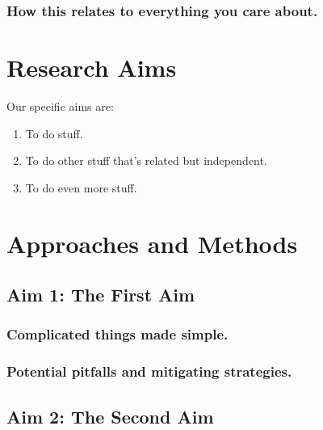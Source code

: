 \documentclass[12pt]{article}
\begin{document}
\subsubsection * {How this relates to everything you care about.}

\lipsum[8-11]


\section {Research Aims}

\lipsum[5]
Our specific aims are:
\vspace{-6pt}
\begin{enumerate}
\itemsep 0pt
\parskip 2pt
\item  To do stuff.
\item  To do other stuff that's related but independent.
\item To do even more stuff.

\end{enumerate}





\section {Approaches and Methods}


\subsection {Aim 1: The First Aim}\label{sec:aim1}

\lipsum[88]

\subsubsection {Complicated things made simple.}

\lipsum[56-59]


\subsubsection {Potential pitfalls and mitigating strategies.}

\lipsum[80-81]


\subsection {Aim 2: The Second Aim}

\lipsum[44]
\end{document}

